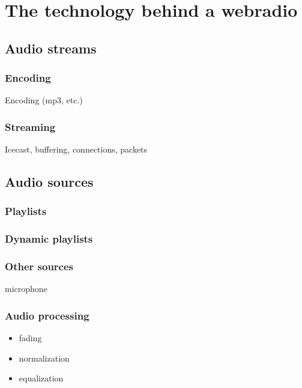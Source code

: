 \chapter{The technology behind a webradio}
\section{Audio streams}
\subsection{Encoding}
Encoding (mp3, etc.)

\subsection{Streaming}
Icecast, buffering, connections, packets

\section{Audio sources}
\subsection{Playlists}

\subsection{Dynamic playlists}

\subsection{Other sources}
microphone

\subsection{Audio processing}

\begin{itemize}
\item fading
\item normalization
\item equalization
\end{itemize}